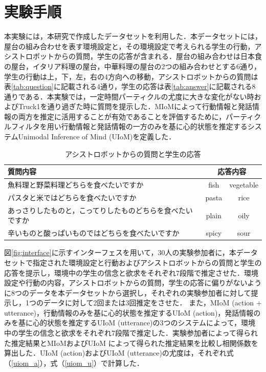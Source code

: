 \section{実験手順}

\par
本実験には，本研究で作成したデータセットを利用した．本データセットには，屋台の組み合わせを表す環境設定と，その環境設定で考えられる学生の行動，アシストロボットからの質問，学生の応答が含まれる．屋台の組み合わせは日本食の屋台，イタリア料理の屋台，中華料理の屋台の2つの組み合わせとする6通り，学生の行動は上，下，左，右の4方向への移動，アシストロボットからの質問は表\ref{tab:question}に記載される4通り，学生の応答は表\ref{tab:answer}に記載される8通りである．本実験では，一定時間パーティクルの尤度に大きな変化がない時およびTruck1を通り過ぎた時に質問を提示した．MIoMによって行動情報と発話情報の両方を推定に活用することが有効であることを評価するために，パーティクルフィルタを用い行動情報と発話情報の一方のみを基に心的状態を推定するシステムUnimodal Inference of Mind (UIoM)を定義した．


\begin{table}[htb]
  \begin{center}
  \caption{アシストロボットからの質問と学生の応答}
  \label{tab:q_a}
  \begin{tabular}{lcc} \hline
    質問内容&\multicolumn{2}{c}{応答内容}\\\hline
    魚料理と野菜料理どちらを食べたいですか&fish&vegetable\\
    パスタと米ではどちらを食べたいですか&pasta&rice\\
    あっさりしたものと，こってりしたものどちらを食べたいですか&plain&oily\\
    辛いものと酸っぱいものではどちらを食べたいですか&spicy&sour\\\hline
  \end{tabular}
\end{center}
\end{table}



\par
図\ref{fig:interface}に示すインターフェスを用いて，30人の実験参加者に，本データセットで指定された環境設定と行動およびアシストロボットからの質問と学生の応答を提示し，環境中の学生の信念と欲求をそれぞれ7段階で推定させた．環境設定や行動の内容，アシストロボットからの質問，学生の応答に偏りがないように8つのデータを本データセットから選択し，それぞれの実験参加者に対して提示し，1つのデータに対して2回または3回推定をさせた．
また，MIoM (action + utterance)，行動情報のみを基に心的状態を推定するUIoM (action)，発話情報のみを基に心的状態を推定するUIoM (utterance)の3つのシステムによって，環境中の学生の信念と欲求をそれぞれ7段階で推定した．実験参加者によって得られた推定結果とMIoMおよびUIoM によって得られた推定結果を比較し相関係数を算出した．UIoM (action)およびUIoM (utterance)の尤度は，それぞれ式（\ref{uiom_a}），式（\ref{uiom_u}）で計算した．

